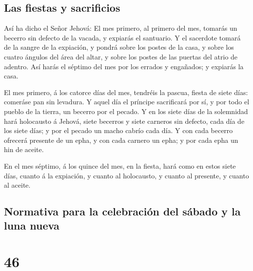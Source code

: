 \hypertarget{las-fiestas-y-sacrificios}{%
\subsection{Las fiestas y sacrificios}\label{las-fiestas-y-sacrificios}}

 Así ha dicho el Señor Jehová: El mes primero, al primero
del mes, tomarás un becerro sin defecto de la vacada, y expiarás el
santuario.  Y el sacerdote tomará de la sangre de la
expiación, y pondrá sobre los postes de la casa, y sobre los cuatro
ángulos del área del altar, y sobre los postes de las puertas del atrio
de adentro.  Así harás el séptimo del mes por los errados y
engañados; y expiarás la casa.

 El mes primero, á los catorce días del mes, tendréis la
pascua, fiesta de siete días: comeráse pan sin levadura.  Y
aquel día el príncipe sacrificará por sí, y por todo el pueblo de la
tierra, un becerro por el pecado.  Y en los siete días de
la solemnidad hará holocausto á Jehová, siete becerros y siete carneros
sin defecto, cada día de los siete días; y por el pecado un macho cabrío
cada día.  Y con cada becerro ofrecerá presente de un epha,
y con cada carnero un epha; y por cada epha un hin de aceite.

 En el mes séptimo, á los quince del mes, en la fiesta,
hará como en estos siete días, cuanto á la expiación, y cuanto al
holocausto, y cuanto al presente, y cuanto al aceite.

\hypertarget{normativa-para-la-celebraciuxf3n-del-suxe1bado-y-la-luna-nueva}{%
\subsection{Normativa para la celebración del sábado y la luna
nueva}\label{normativa-para-la-celebraciuxf3n-del-suxe1bado-y-la-luna-nueva}}

\hypertarget{section-45}{%
\section{46}\label{section-45}}

